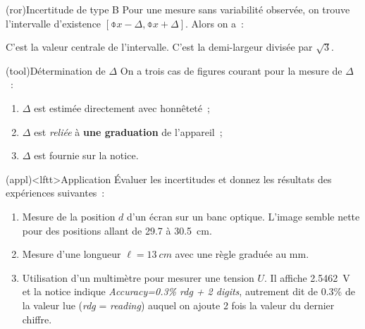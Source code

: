 \documentclass[../../main/main.tex]{subfiles}
\begin{document}
\begin{tcb*}(ror){Incertitude de type B}
	Pour une mesure sans variabilité observée, on trouve l'intervalle d'existence
	$[\obar{x} - \Delta, \obar{x} + \Delta]$. Alors on a~:
	\smallbreak
	\begin{isd}[cnt, sidebyside align=top]
		C'est la valeur centrale de l'intervalle.
		\psw{%
			\[
				\boxed{x\ind{exp} = \obar{x}}
			\]
		}%
		\vspace{-15pt}
		\tcblower
		C'est la demi-largeur divisée par $\sqrt{3}$.
		\psw{%
			\[
				\boxed{u(x\ind{exp}) = \frac{\Delta}{\sqrt{3}}}
			\]
		}%
		\vspace{-15pt}
	\end{isd}
\end{tcb*}

\begin{tcb}(tool){Détermination de $\Delta$}
	On a trois cas de figures courant pour la mesure de $\Delta$~:
	\begin{enumerate}
		\item $\Delta$ est estimée directement avec honnêteté~;
		\item $\Delta$ est \textit{reliée} à \textbf{une graduation} de l'appareil~;
		\item $\Delta$ est fournie sur la notice.
	\end{enumerate}
\end{tcb}

\begin{tcb*}(appl)<lftt>{Application}
	Évaluer les incertitudes et donnez les résultats des expériences suivantes~:
	\begin{enumerate}
		\item Mesure de la position $d$ d'un écran sur un banc optique. L'image
		      semble nette pour des positions allant de \num{29.7} à \SI{30.5}{cm}.
		      \smallbreak
		      \vspace*{-20pt}
		\item Mesure d'une longueur $\ell = \SI{13}{cm}$ avec une règle graduée au
		      \si{mm}.
		      \smallbreak
		      \vspace*{-20pt}
		\item Utilisation d'un multimètre pour mesurer une tension $U$. Il affiche
		      \SI{2.5462}{V} et la notice indique \textit{Accuracy=0.3\% rdg + 2
			      digits}, autrement dit de \num{0.3}\% de la valeur lue (\textit{rdg} =
		      \textit{reading}) auquel on ajoute 2 fois la valeur du dernier chiffre.
		      \smallbreak
		      \vspace*{-20pt}
	\end{enumerate}
\end{tcb*}
\end{document}
